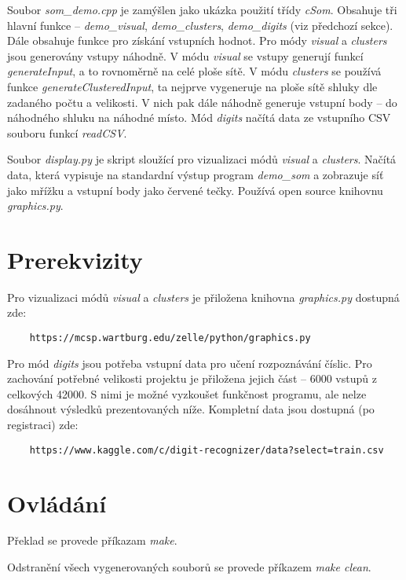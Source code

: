 \documentclass[11pt]{article}
\begin{document}
Soubor \textit{som\_demo.cpp} je zamýšlen jako ukázka použití třídy \textit{cSom}. Obsahuje tři hlavní funkce -- \textit{demo\_visual}, \textit{demo\_clusters}, \textit{demo\_digits} (viz předchozí sekce). Dále obsahuje funkce pro získání vstupních hodnot. Pro módy \textit{visual} a \textit{clusters} jsou generovány vstupy náhodně. V módu \textit{visual} se vstupy generují funkcí \textit{generateInput}, a to rovnoměrně na celé ploše sítě. V módu \textit{clusters} se používá funkce \textit{generateClusteredInput}, ta nejprve vygeneruje na ploše sítě shluky dle zadaného počtu a velikosti. V nich pak dále náhodně generuje vstupní body -- do náhodného shluku na náhodné místo. Mód \textit{digits} načítá data ze vstupního CSV souboru funkcí \textit{readCSV}.

Soubor \textit{display.py} je skript sloužící pro vizualizaci módů \textit{visual} a \textit{clusters}. Načítá data, která vypisuje na standardní výstup program \textit{demo\_som} a zobrazuje síť jako mřížku a vstupní body jako červené tečky. Používá open source knihovnu \textit{graphics.py}.

\section*{Prerekvizity}
Pro vizualizaci módů \textit{visual} a \textit{clusters} je přiložena knihovna \textit{graphics.py} dostupná zde:

\begin{verbatim}
	https://mcsp.wartburg.edu/zelle/python/graphics.py
\end{verbatim}

\noindent
Pro mód \textit{digits} jsou potřeba vstupní data pro učení rozpoznávání číslic. Pro zachování potřebné velikosti projektu je přiložena jejich část -- 6000 vstupů z celkových 42000. S nimi je možné vyzkoušet funkčnost programu, ale nelze dosáhnout výsledků prezentovaných níže. Kompletní data jsou dostupná (po registraci) zde:

\begin{verbatim}
	https://www.kaggle.com/c/digit-recognizer/data?select=train.csv
\end{verbatim}

\section*{Ovládání}
Překlad se provede příkazam \textit{make}.

\vspace{5pt}
\noindent
Odstranění všech vygenerovaných souborů se provede příkazem \textit{make clean}.
\vspace{5pt}
\newpage
\end{document}
